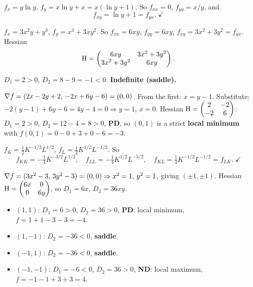 \begin{solutions}
  \item $f_x = y\ln y$, $f_y = x\ln y + x = x(\ln y + 1)$. So
        $f_{xx} = 0$, $f_{yy} = x/y$, and
        \[
          f_{xy} = \ln y + 1 = f_{yx} . \; \checkmark
        \]

  \item $f_x = 3x^{2}y + y^{3}$, $f_y = x^{3} + 3xy^{2}$. So
        $f_{xx} = 6xy$, $f_{yy} = 6xy$,
        $f_{xy} = 3x^{2} + 3y^{2} = f_{yx}$. Hessian
        \[
          \operatorname{H} = \begin{pmatrix}
            6xy & 3x^{2}+3y^{2} \\
            3x^{2}+3y^{2} & 6xy
          \end{pmatrix} .
        \]

  \item $D_1 = 2 > 0$, $D_2 = 8 - 9 = -1 < 0$. \textbf{Indefinite
        (saddle).}

  \item $\nabla f = (2x-2y+2,\,-2x+6y-6) = (0,0)$. From the first:
        $x = y-1$. Substitute: $-2(y-1)+6y-6 = 4y-4 = 0 \Rightarrow y=1$,
        $x=0$. Hessian $\operatorname{H} = \begin{pmatrix}2&-2\\-2&6\end{pmatrix}$:
        $D_1=2>0$, $D_2=12-4=8>0$, \textbf{PD}, so $(0,1)$ is a strict
        \textbf{local minimum} with $f(0,1) = 0-0+3+0-6 = -3$.

  \item $f_K = \tfrac12K^{-1/2}L^{1/2}$, $f_L = \tfrac12K^{1/2}L^{-1/2}$.
        So
        \[
          f_{KK} = -\tfrac14K^{-3/2}L^{1/2}, \quad
          f_{LL} = -\tfrac14K^{1/2}L^{-3/2}, \quad
          f_{KL} = \tfrac14K^{-1/2}L^{-1/2} = f_{LK} . \; \checkmark
        \]

  \item $\nabla f = (3x^{2}-3,\,3y^{2}-3) = (0,0) \Rightarrow x^{2}=1,\,
        y^{2}=1$, giving $(\pm1,\pm1)$. Hessian
        $\operatorname{H} = \begin{pmatrix}6x&0\\0&6y\end{pmatrix}$, so $D_1=6x$,
        $D_2=36xy$.
        \begin{itemize}
          \item $(1,1)$: $D_1=6>0$, $D_2=36>0$, \textbf{PD}: local
                minimum, $f = 1+1-3-3 = -4$.
          \item $(1,-1)$: $D_2=-36<0$, \textbf{saddle}.
          \item $(-1,1)$: $D_2=-36<0$, \textbf{saddle}.
          \item $(-1,-1)$: $D_1=-6<0$, $D_2=36>0$, \textbf{ND}: local
                maximum, $f = -1-1+3+3 = 4$.
        \end{itemize}


\end{solutions}
